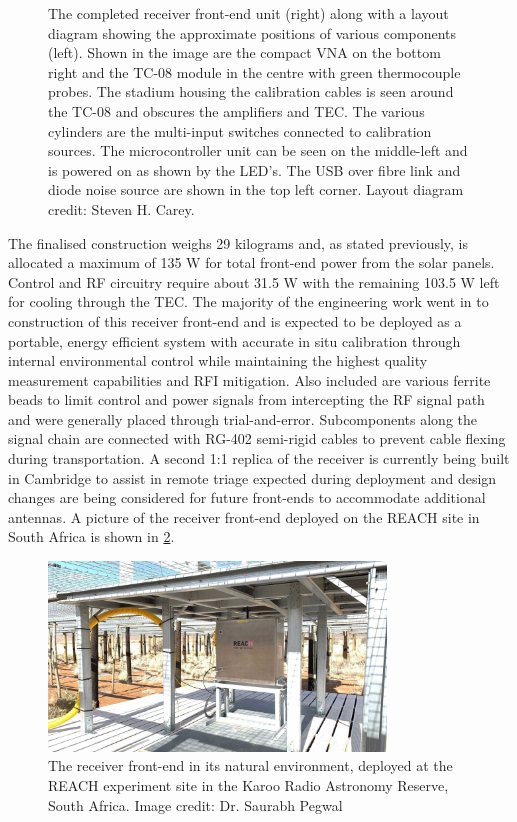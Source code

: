 \begin{figure}
\begin{subfigure}{.45\textwidth}
    \end{subfigure}
    \caption{The completed receiver front-end unit (right) along with a layout diagram showing the approximate positions of various components (left). Shown in the image are the compact VNA on the bottom right and the TC-08 module in the centre with green thermocouple probes. The stadium housing the calibration cables is seen around the TC-08 and obscures the amplifiers and TEC. The various cylinders are the multi-input switches connected to calibration sources. The microcontroller unit can be seen on the middle-left and is powered on as shown by the LED's. The USB over fibre link and diode noise source are shown in the top left corner. Layout diagram credit: Steven H. Carey.}
    \label{fig:frontend_complete}
\end{figure}
The finalised construction weighs 29 kilograms and, as stated previously, is allocated a maximum of 135 W for total front-end power from the solar panels. Control and RF circuitry require about 31.5 W with the remaining 103.5 W left for cooling through the TEC. The majority of the engineering work went in to construction of this receiver front-end and is expected to be deployed as a portable, energy efficient system with accurate in situ calibration through internal environmental control while maintaining the highest quality measurement capabilities and RFI mitigation. Also included are various ferrite beads to limit control and power signals from intercepting the RF signal path and were generally placed through trial-and-error. Subcomponents along the signal chain are connected with RG-402 semi-rigid cables to prevent cable flexing during transportation. A second 1:1 replica of the receiver is currently being built in Cambridge to assist in remote triage expected during deployment and design changes are being considered for future front-ends to accommodate additional antennas. A picture of the receiver front-end deployed on the REACH site in South Africa is shown in \cref{fig:frontend_deployed}.
\begin{figure}
    \centering
    \includegraphics[width=0.8\textwidth]{receiver_installed.jpeg}
    \caption{The receiver front-end in its natural environment, deployed at the REACH experiment site in the Karoo Radio Astronomy Reserve, South Africa. Image credit: Dr. Saurabh Pegwal}
    \label{fig:frontend_deployed}
\end{figure}


